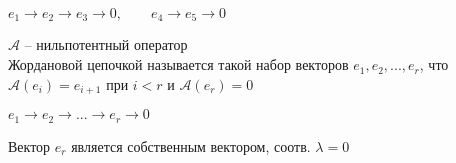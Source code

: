 \begin{notation}
	$ e_1 \to e_2 \to e_3 \to 0, \qquad e_4 \to e_5 \to 0 $
\end{notation}

\begin{definition}
	$ \mathcal{A} $ -- нильпотентный оператор \\
	Жордановой цепочкой называется такой набор векторов $ e_1, e_2, ..., e_r $, что $ \mathcal{A}(e_i) = e_{i + 1} $ при $ i < r $ и $ \mathcal{A}(e_r) = 0 $
\end{definition}

\begin{notation}
	$ e_1 \to e_2 \to ... \to e_r \to 0 $
\end{notation}

\begin{remark}
	Вектор $ e_r $ является собственным вектором, соотв. $ \lambda = 0 $
\end{remark}

